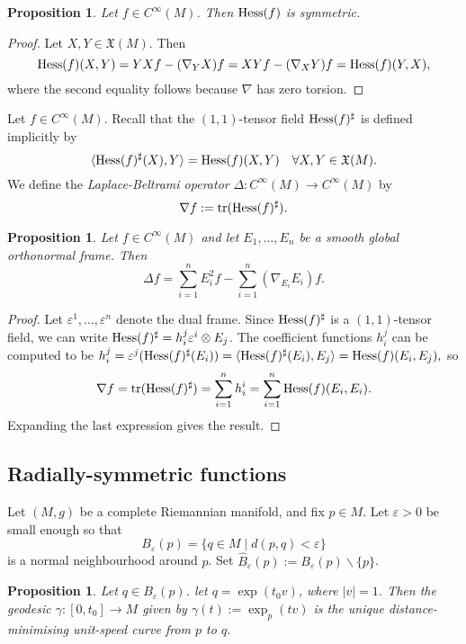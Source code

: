 \documentclass{amsart}
\newcommand{\hess}{\text{\normalfont Hess}}
\newcommand{\tr}{\text{\normalfont tr}}
\theoremstyle{plain}
\newtheorem{proposition}[theorem]{Proposition}
\theoremstyle{definition}
\theoremstyle{remark}
\begin{document}
	\begin{proposition}
		Let $f \in C^\infty(M)$. Then $\hess(f)$ is symmetric.
	\end{proposition}
	\begin{proof}
		Let $X,Y \in \mathfrak X(M)$. Then
		$$\hess(f)(X,Y) = YXf - (\nabla_Y X) f = XY f -( \nabla_X Y )f = \hess(f)(Y,X),$$
		where the second equality follows because $\nabla$ has zero torsion.
	\end{proof}

	Let $f \in C^\infty(M)$. Recall that the $(1,1)$-tensor field $\hess(f)^\sharp$ is defined implicitly by $$\langle \hess(f)^\sharp(X),Y \rangle = \hess(f)(X,Y) \quad \forall X,Y \in \mathfrak X(M).$$
	We define the \emph{Laplace-Beltrami operator} $\Delta:C^\infty(M) \rightarrow C^\infty(M)$ by $$\nabla f := \tr(\hess(f)^\sharp).$$
	
	\begin{proposition}
		Let $f \in C^\infty(M)$ and let $E_1,\ldots,E_n$ be a smooth global orthonormal frame. Then 
		$$\Delta f = \sum_{i=1}^n E_i^2 f - \sum_{i=1}^n (\nabla_{E_i} E_i)f.$$
	\end{proposition}
	\begin{proof}
		Let $\varepsilon^1,\ldots,\varepsilon^n$ denote the dual frame. Since $\hess(f)^\sharp$ is a $(1,1)$-tensor field, we can write $\hess(f)^\sharp = h_i^j \varepsilon^i \otimes E_j$. The coefficient functions $h_i^j$ can be computed to be 
		$h_i^j  = \varepsilon^j(\hess(f)^\sharp (E_i)) =  \langle \hess(f)^\sharp (E_i), E_j \rangle  = \hess(f) (E_i, E_j),$
		so 
		$$\nabla f = \tr(\hess(f)^\sharp ) = \sum_{i=1}^n h_i^i = \sum_{i=1}^n\hess(f) (E_i, E_i).$$
		Expanding the last expression gives the result.
	\end{proof}

	\subsection{Radially-symmetric functions}
	Let $(M,g)$ be a complete Riemannian manifold, and fix $p \in M$. Let $\varepsilon > 0$ be small enough so that 
	$$B_\varepsilon(p) = \Big\{q \in M \;\Big| \; d(p,q) < \varepsilon\Big\}$$
	is a normal neighbourhood around $p$. Set $\widehat B_\varepsilon(p) := B_\varepsilon(p) \backslash\{p\}$.
	
	\begin{proposition}
		Let $q  \in B_\varepsilon(p)$.  let $q = \exp(t_0 v)$, where $|v| = 1$. Then the geodesic $\gamma:[0,t_0] \rightarrow M$ given by $\gamma(t) := \exp_p(tv)$ is the unique distance-minimising unit-speed curve from $p$ to $q$.
	\end{proposition}
\end{document}
